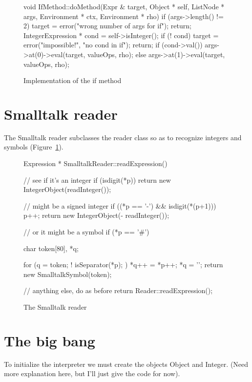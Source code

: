 \begin{figure}
\begin{cprog}
void IfMethod::doMethod(Expr & target, Object * self, 
	ListNode * args, Environment * ctx, Environment * rho)
{
	if (args->length() != 2) {
		target = error("wrong number of args for if");
		return;
		}
	IntegerExpression * cond = self->isInteger();
	if (! cond) {
		target = error("impossible!", "no cond in if");
		return;
		}
	if (cond->val())
		args->at(0)->eval(target, valueOps, rho);
	else
		args->at(1)->eval(target, valueOps, rho);
}
\end{cprog}
\caption{Implementation of the if method}
\end{figure}

\section{Smalltalk reader}

The Smalltalk reader subclasses the reader class so as to recognize
integers and symbols (Figure~\ref{smalltalkreader}).

\begin{figure}
\begin{cprog}
Expression * SmalltalkReader::readExpression()
{
	// see if it's an integer
	if (isdigit(*p))
		return new IntegerObject(readInteger());

	// might be a signed integer
	if ((*p == '-') && isdigit(*(p+1))) {
		p++;
		return new IntegerObject(- readInteger());
		}

	// or it might be a symbol
	if (*p == '#') {
		char token[80], *q;

		for (q = token; ! isSeparator(*p); )
			*q++ = *p++;
		*q = '\0';
		return new SmalltalkSymbol(token);
		}

	// anything else, do as before
	return Reader::readExpression();
}
\end{cprog}
\caption{The Smalltalk reader}\label{smalltalkreader}
\end{figure}

\section{The big bang}

To initialize the interpreter we must create the objects {\sf Object} and
{\sf Integer}.  (Need more explanation here, but I'll just give the code
for now).

